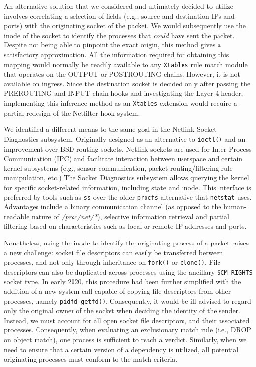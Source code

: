 An alternative solution that we considered and ultimately decided to utilize involves correlating a selection of fields (e.g., source and destination IPs and ports) with the originating socket of the packet. We would subsequently use the inode of the socket to identify the processes that \textit{could} have sent the packet. Despite not being able to pinpoint the exact origin, this method gives a satisfactory approximation. All the information required for obtaining this mapping would normally be readily available to any \texttt{Xtables} rule match module that operates on the OUTPUT or POSTROUTING chains. However, it is not available on ingress. Since the destination socket is decided only after passing the PREROUTING and INPUT chain hooks and investigating the Layer 4 header, implementing this inference method as an \texttt{Xtables} extension would require a partial redesign of the Netfilter hook system.

We identified a different means to the same goal in the Netlink Socket Diagnostics subsystem. Originally designed as an alternative to \texttt{ioctl()} and an improvement over BSD routing sockets, Netlink sockets \cite{RFC3549} are used for Inter Process Communication (IPC) and facilitate interaction between userspace and certain kernel subsystems (e.g., sensor communication, packet routing/filtering rule manipulation, etc.) The Socket Diagnostics subsystem allows querying the kernel for specific socket-related information, including state and inode. This interface is preferred by tools such as \texttt{ss} over the older \texttt{procfs} alternative that \texttt{netstat} uses. Advantages include a binary communication channel (as opposed to the human-readable nature of \textit{/proc/net/*}), selective information retrieval and partial filtering based on characteristics such as local or remote IP addresses and ports.

Nonetheless, using the inode to identify the originating process of a packet raises a new challenge: socket file descriptors can easily be transferred between processes, and not only through inheritance on \texttt{fork()} or \texttt{clone()}. File descriptors can also be duplicated across processes using the ancillary \texttt{SCM\_RIGHTS} socket type. In early 2020, this procedure had been further simplified with the addition of a new system call capable of copying file descriptors from other processes, namely \texttt{pidfd\_getfd()}. Consequently, it would be ill-advised to regard only the original owner of the socket when deciding the identity of the sender. Instead, we must account for all open socket file descriptors, and their associated processes. Consequently, when evaluating an exclusionary match rule (i.e., DROP on object match), one process is sufficient to reach a verdict. Similarly, when we need to ensure that a certain version of a dependency is utilized, all potential originating processes must conform to the match criteria.

